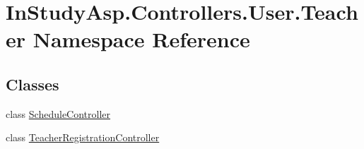\hypertarget{namespace_in_study_asp_1_1_controllers_1_1_user_1_1_teacher}{}\section{In\+Study\+Asp.\+Controllers.\+User.\+Teacher Namespace Reference}
\label{namespace_in_study_asp_1_1_controllers_1_1_user_1_1_teacher}
\subsection*{Classes}
\begin{DoxyCompactItemize}
\item 
class \hyperlink{class_in_study_asp_1_1_controllers_1_1_user_1_1_teacher_1_1_schedule_controller}{Schedule\+Controller}
\item 
class \hyperlink{class_in_study_asp_1_1_controllers_1_1_user_1_1_teacher_1_1_teacher_registration_controller}{Teacher\+Registration\+Controller}
\end{DoxyCompactItemize}
